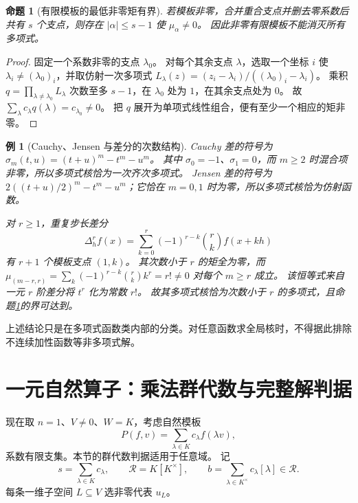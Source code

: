\documentclass[11pt,a4paper,oneside,openany]{book}
\theoremstyle{lecture}
\newtheorem{proposition}[theorem]{命题}
\newtheorem{example}[theorem]{例}
\numberwithin{equation}{section}
\begin{document}
\begin{proposition}[有限模板的最低非零矩有界]\label{lin:prop:momentbound}
若模板非零，合并重合支点并删去零系数后共有 $s$ 个支点，则存在 $|\alpha|\le s-1$ 使 $\mu_\alpha\ne0$。
因此非零有限模板不能消灭所有多项式。
\end{proposition}
\begin{proof}
固定一个系数非零的支点 $\lambda_0$。
对每个其余支点 $\lambda$，选取一个坐标 $i$ 使 $\lambda_i\ne(\lambda_0)_i$，并取仿射一次多项式
$L_\lambda(z)=(z_i-\lambda_i)/((\lambda_0)_i-\lambda_i)$。
乘积 $q=\prod_{\lambda\ne\lambda_0}L_\lambda$ 次数至多 $s-1$，在 $\lambda_0$ 处为 $1$，在其余支点处为 $0$。
故 $\sum_\lambda c_\lambda q(\lambda)=c_{\lambda_0}\ne0$。
把 $q$ 展开为单项式线性组合，便有至少一个相应的矩非零。
\end{proof}

\begin{example}[Cauchy、Jensen 与差分的次数结构]
Cauchy 差的符号为 $\sigma_m(t,u)=(t+u)^m-t^m-u^m$。
其中 $\sigma_0=-1$、$\sigma_1=0$，而 $m\ge2$ 时混合项非零，所以多项式核恰为一次齐次多项式。
Jensen 差的符号为 $2((t+u)/2)^m-t^m-u^m$；它恰在 $m=0,1$ 时为零，所以多项式核恰为仿射函数。

对 $r\ge1$，重复步长差分
\[
 \Delta_h^r f(x)=\sum_{k=0}^r(-1)^{r-k}\binom rk f(x+kh)
\]
有 $r+1$ 个模板支点 $(1,k)$。
其次数小于 $r$ 的矩全为零，而
$\mu_{(m-r,r)}=\sum_k(-1)^{r-k}\binom rk k^r=r!\ne0$ 对每个 $m\ge r$ 成立。
该恒等式来自一元 $r$ 阶差分将 $t^r$ 化为常数 $r!$。
故其多项式核恰为次数小于 $r$ 的多项式，且命题\ref{lin:prop:momentbound}的界可达到。
\end{example}
上述结论只是在多项式函数类内部的分类。对任意函数求全局核时，不得据此排除不连续加性函数等非多项式解。

\section{一元自然算子：乘法群代数与完整解判据}\label{lin:sec:dilation}
现在取 $n=1$、$V\ne0$、$W=K$，考虑自然模板
\begin{equation}\label{lin:eq:dilation}
 P(f,v)=\sum_{\lambda\in K}c_\lambda f(\lambda v),
\end{equation}
系数有限支集。本节的群代数判据适用于任意域。
记
\[
 s=\sum_{\lambda\in K}c_\lambda,\qquad
 \mathcal R=K[K^\times],\qquad
 b=\sum_{\lambda\in K^\times}c_\lambda[\lambda]\in\mathcal R.
\]
每条一维子空间 $L\subseteq V$ 选非零代表 $u_L$。
\end{document}
